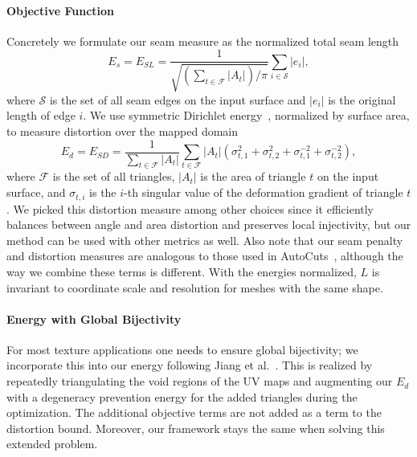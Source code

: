 \paragraph{Objective Function}
Concretely we formulate our seam measure as the normalized total seam length
\[ E_s = E_{SL} = \frac{1}{\sqrt{(\sum_{t\in\mathcal{F}} |A_t|)/\pi}} \sum_{i \in \mathcal{S}} |e_i|, \]
where $\mathcal{S}$ is the set of all seam edges on the input surface and $|e_i|$ is the original length of edge $i$.
We use symmetric Dirichlet energy~\cite{Smith2015Bijective}, normalized by surface area, to measure distortion over the mapped domain
\[ E_d = E_{SD} = \frac{1}{\sum_{t\in\mathcal{F}} |A_t|} \sum_{t\in\mathcal{F}} |A_t|(\sigma_{t,1}^2 + \sigma_{t,2}^2 + \sigma_{t,1}^{-2} + \sigma_{t,2}^{-2}), \]
where $\mathcal{F}$ is the set of all triangles, $|A_t|$ is the area of triangle $t$ on the input surface, and $\sigma_{t,i}$ is the $i$-th singular value of the deformation gradient of triangle $t$.
We picked this distortion measure among other choices since it efficiently balances between angle and area distortion and preserves local injectivity, but our method can be used with other metrics as well.
Also note that our seam penalty and distortion measures are analogous to those used in AutoCuts~\cite{Poranne2017Autocuts}, although the way we combine these terms is different.  
%
With the energies normalized, $L$ is invariant to coordinate scale and resolution for meshes with the same shape.


\paragraph{Energy with Global Bijectivity}
For most texture applications one needs to ensure global bijectivity; we incorporate this into our energy following Jiang et al.~. This is realized by repeatedly triangulating the void regions of the UV maps and augmenting our $E_d$ with a degeneracy prevention energy for the added triangles during the optimization. The additional objective terms are not added as a term to the distortion bound. Moreover, our framework stays the same when solving this extended problem.





